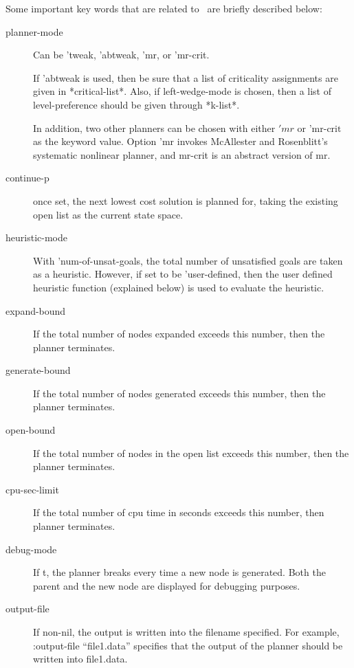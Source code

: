 Some important key words that are related to \tweak\ are briefly
described below:
\begin{description}
\item[planner-mode]  Can be 'tweak, 'abtweak, 'mr, or 'mr-crit.

If 'abtweak is used, then be sure that a list of criticality
assignments are given in *critical-list*.  Also, if left-wedge-mode is
chosen, then a list of level-preference should be given through *k-list*.

In addition, two other planners can be chosen with either $'mr$ or
$\mbox{'mr-crit}$ as the keyword value.  Option 'mr invokes McAllester and
Rosenblitt's systematic nonlinear planner, and mr-crit is an abstract
version of mr.

\item[continue-p] once set, the next lowest cost solution is planned
for, taking the existing open list as the current state space.

\item[heuristic-mode] With 'num-of-unsat-goals, the total number of
unsatisfied goals are taken as a heuristic.  However, if set to be
'user-defined, then the user defined heuristic function (explained
below) is used to evaluate the heuristic.

\item[expand-bound] If the total number of nodes expanded exceeds this
number, then the planner terminates.

\item[generate-bound] If the total number of nodes generated exceeds this
number, then the planner terminates.

\item[open-bound] If the total number of nodes in the open list exceeds this
number, then the planner terminates.

\item[cpu-sec-limit] If the total number of cpu time in seconds
exceeds this number, then planner terminates.

\item[debug-mode] If t, the planner breaks every time a new node is
generated.  Both the parent and the new node are displayed for
debugging purposes.

\item[output-file]  If non-nil, the output is written into the
filename specified.  For example, :output-file ``file1.data''
specifies that the output of the planner should be written into
file1.data. 


\end{description}

